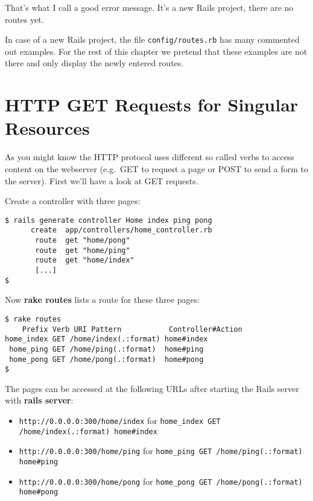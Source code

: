 \documentclass[a4paper]{book}
\begin{document}
That's what I call a good error message. It's a new Rails project, there are no routes yet.

In case of a new Rails project, the file \texttt{config/routes.rb} has many commented out examples. For the rest of this chapter we pretend that these examples are not there and only display the newly entered routes.

\section{HTTP GET Requests for Singular Resources}\label{http-get-requests-for-singular-resources}

As you might know the HTTP protocol uses different so called verbs to access content on the webserver (e.g.~GET to request a page or POST to send a form to the server). First we'll have a look at GET requests.

Create a controller with three pages:

\begin{shaded}\begin{verbatim}
$ rails generate controller Home index ping pong
      create  app/controllers/home_controller.rb
       route  get "home/pong"
       route  get "home/ping"
       route  get "home/index"
       [...]
$
\end{verbatim}\end{shaded}

Now \textbf{rake routes} lists a route for these three pages:

\begin{shaded}\begin{verbatim}
$ rake routes
    Prefix Verb URI Pattern           Controller#Action
home_index GET /home/index(.:format) home#index
 home_ping GET /home/ping(.:format)  home#ping
 home_pong GET /home/pong(.:format)  home#pong
$
\end{verbatim}\end{shaded}

The pages can be accessed at the following URLs after starting the Rails server with \textbf{rails server}:

\begin{itemize}
\itemsep1pt\parskip0pt
\item
  \texttt{http://0.0.0.0:300/home/index} for \texttt{home\_index GET /home/index(.:format)           home\#index}
\item
  \texttt{http://0.0.0.0:300/home/ping} for \texttt{home\_ping GET /home/ping(.:format)           home\#ping}
\item
  \texttt{http://0.0.0.0:300/home/pong} for \texttt{home\_pong GET /home/pong(.:format)           home\#pong}
\end{itemize}
\end{document}
